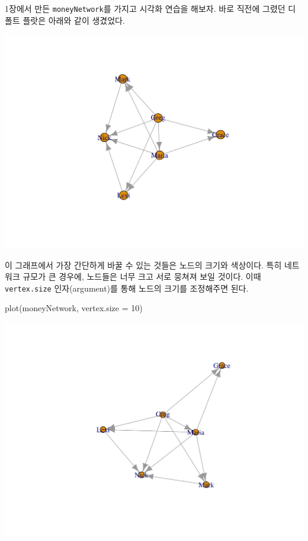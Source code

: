\documentclass[
]{book}
\newenvironment{Shaded}{\begin{snugshade}}{\end{snugshade}}
\newcommand{\AttributeTok}[1]{\textcolor[rgb]{0.77,0.63,0.00}{#1}}
\newcommand{\DecValTok}[1]{\textcolor[rgb]{0.00,0.00,0.81}{#1}}
\newcommand{\FunctionTok}[1]{\textcolor[rgb]{0.00,0.00,0.00}{#1}}
\newcommand{\NormalTok}[1]{#1}
\begin{document}
1장에서 만든 \texttt{moneyNetwork}를 가지고 시각화 연습을 해보자. 바로 직전에 그렸던 디폴트 플랏은 아래와 같이 생겼었다.

\begin{center}\includegraphics[width=0.8\linewidth]{images/2} \end{center}

이 그래프에서 가장 간단하게 바꿀 수 있는 것들은 노드의 크기와 색상이다. 특히 네트워크 규모가 큰 경우에, 노드들은 너무 크고 서로 뭉쳐져 보일 것이다. 이때 \texttt{vertex.size} 인자(argument)를 통해 노드의 크기를 조정해주면 된다.

\begin{Shaded}
\begin{Highlighting}[]
\FunctionTok{plot}\NormalTok{(moneyNetwork, }\AttributeTok{vertex.size =} \DecValTok{10}\NormalTok{)}
\end{Highlighting}
\end{Shaded}

\begin{center}\includegraphics[width=0.8\linewidth]{images/3} \end{center}
\end{document}
